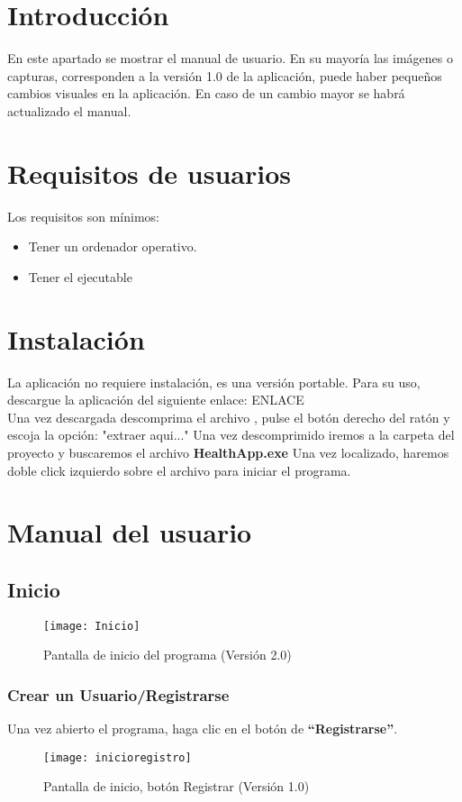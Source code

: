 
\section{Introducción}
En este apartado se mostrar el manual de usuario. En su mayoría las imágenes o capturas, corresponden a la versión 1.0 de la aplicación, puede haber pequeños cambios visuales en la aplicación. En caso de un cambio mayor se habrá actualizado el manual.
\section{Requisitos de usuarios}
Los requisitos son mínimos:
\begin{itemize}
\item Tener un ordenador operativo.
\item Tener el ejecutable
\end{itemize}
\section{Instalación}
La aplicación no requiere instalación, es una versión portable. Para su uso, descargue la aplicación del siguiente enlace: ENLACE\\
Una vez descargada descomprima el archivo , pulse el botón derecho del ratón y escoja la opción: "extraer aqui..."
Una vez descomprimido iremos a la carpeta del proyecto y buscaremos el archivo \textbf{HealthApp.exe}
Una vez localizado, haremos doble click izquierdo sobre el archivo para iniciar el programa.

\section{Manual del usuario}
\subsection{Inicio}
\begin{figure}[htb]
\centering
\texttt{[image: Inicio]} 
\caption{Pantalla de inicio del programa (Versión 2.0)}
\end{figure}
\subsubsection{Crear un Usuario/Registrarse}
Una vez abierto el programa, haga clic en el botón de \textbf{“Registrarse”}. 
\begin{figure}[htb]
\centering
\texttt{[image: inicioregistro]} 
\caption{Pantalla de inicio, botón Registrar (Versión 1.0)}
\end{figure}

